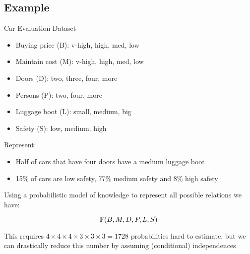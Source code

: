 \subsection{Example}

\begin{frame}
	\begin{block}{Car Evaluation Dataset}
		\begin{itemize}
			\item Buying price (B): v-high, high, med, low
			\item Maintain cost (M): v-high, high, med, low
			\item Doors (D): two, three, four, more
			\item Persons (P): two, four, more
			\item Luggage boot (L): small, medium, big
			\item Safety (S): low, medium, high
		\end{itemize}
	\end{block}
	Represent:
	\begin{block}{}
		\begin{itemize}
			\item Half of cars that have four doors have a medium luggage boot
			\item 15\% of cars are low safety, 77\% medium safety and 8\% high safety
		\end{itemize}
	\end{block}
\end{frame}
	
\begin{frame}
	Using a probabilistic model of knowledge to represent all possible relations we have:
	\begin{block}{}
		\[ \P( B , M , D , P , L , S ) \]
	\end{block}
	This requires $4 \times 4 \times 4 \times 3 \times 3 \times 3 = 1728$ probabilities hard to estimate, but we can drastically reduce this number by assuming (conditional) independences
\end{frame}
	
